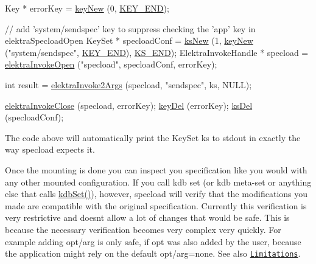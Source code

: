 \begin{DoxyCode}
Key * errorKey = \hyperlink{group__key_gad23c65b44bf48d773759e1f9a4d43b89}{keyNew} (0, \hyperlink{group__key_gga9b703ca49f48b482def322b77d3e6bc8aa8adb6fcb92dec58fb19410eacfdd403}{KEY\_END});

\textcolor{comment}{// add 'system/sendspec' key to suppress checking the 'app' key in elektraSpecloadOpen}
KeySet * specloadConf = \hyperlink{group__keyset_ga671e1aaee3ae9dc13b4834a4ddbd2c3c}{ksNew} (1, \hyperlink{group__key_gad23c65b44bf48d773759e1f9a4d43b89}{keyNew} (\textcolor{stringliteral}{"system/sendspec"}, \hyperlink{group__key_gga9b703ca49f48b482def322b77d3e6bc8aa8adb6fcb92dec58fb19410eacfdd403}{KEY\_END}), 
      \hyperlink{group__keyset_ga7a28fce3773b2c873c94ac80b8b4cd54}{KS\_END});
ElektraInvokeHandle * specload = \hyperlink{group__invoke_ga3eb20131e9a8fc9a6cebf126927c09bc}{elektraInvokeOpen} (\textcolor{stringliteral}{"specload"}, specloadConf, errorKey);

\textcolor{keywordtype}{int} result = \hyperlink{group__invoke_gaa257d93399c60f73c611205bbfa7c9a0}{elektraInvoke2Args} (specload, \textcolor{stringliteral}{"sendspec"}, ks, NULL);

\hyperlink{group__invoke_ga684a21daa0b3c20783c55184a9157b3b}{elektraInvokeClose} (specload, errorKey);
\hyperlink{group__key_ga3df95bbc2494e3e6703ece5639be5bb1}{keyDel} (errorKey);
\hyperlink{group__keyset_ga27e5c16473b02a422238c8d970db7ac8}{ksDel} (specloadConf);
\end{DoxyCode}


The code above will automatically print the Key\+Set {\ttfamily ks} to stdout in exactly the way {\ttfamily specload} expects it.

Once the mounting is done you can inspect you specification like you would with any other mounted configuration. If you call {\ttfamily kdb set} (or {\ttfamily kdb meta-\/set} or anything else that calls {\ttfamily \hyperlink{group__kdb_ga11436b058408f83d303ca5e996832bcf}{kdb\+Set()}}), however, {\ttfamily specload} will verify that the modifications you made are compatible with the original specification. Currently this verification is very restrictive and doesn\textquotesingle{}t allow a lot of changes that would be safe. This is because the necessary verification becomes very complex very quickly. For example adding {\ttfamily opt/arg} is only safe, if {\ttfamily opt} was also added by the user, because the application might rely on the default {\ttfamily opt/arg=none}. See also \href{#limitations}{\tt Limitations}.

